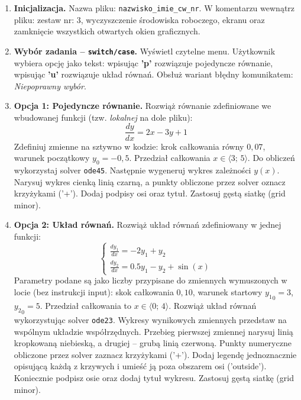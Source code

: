\documentclass[a4paper,11pt]{article}
\begin{document}
\begin{enumerate}[leftmargin=*, label=\textbf{\arabic*.}, itemsep=2pt]

  \item \textbf{Inicjalizacja.}
    Nazwa pliku: \texttt{nazwisko\_imie\_cw\_nr}. W komentarzu wewnątrz pliku: zestaw nr: 3, wyczyszczenie środowiska roboczego, ekranu oraz zamknięcie wszystkich otwartych okien graficznych.

  \item \textbf{Wybór zadania -- \texttt{switch/case}.}
    Wyświetl czytelne menu. Użytkownik wybiera opcję jako tekst: wpisując \textbf{'p'} rozwiązuje pojedyncze równanie, wpisując \textbf{'u'} rozwiązuje układ równań. Obsłuż wariant błędny komunikatem: \textit{Niepoprawny wybór}.

  \item \textbf{Opcja 1: Pojedyncze równanie.}
    Rozwiąż równanie zdefiniowane we wbudowanej funkcji (tzw. \textit{lokalnej} na dole pliku):
    \[ \frac{dy}{dx} = 2x - 3y + 1 \]
    Zdefiniuj zmienne na sztywno w kodzie: krok całkowania równy $0{,}07$, warunek początkowy $y_0 = -0{,}5$. Przedział całkowania $x \in \langle 3;\,5 \rangle$.
    Do obliczeń wykorzystaj solver \texttt{ode45}. Następnie wygeneruj wykres zależności $y(x)$. Narysuj wykres cienką linią czarną, a punkty obliczone przez solver oznacz krzyżykami ('+'). Dodaj podpisy osi oraz tytuł. Zastosuj gęstą siatkę (grid minor).

  \item \textbf{Opcja 2: Układ równań.}
    Rozwiąż układ równań zdefiniowany w jednej funkcji:\\[-0.5em]
    \[
    \begin{cases}
      \frac{dy_1}{dx} = -2y_1 + y_2 \\
      \frac{dy_2}{dx} = 0.5y_1 - y_2 + \sin(x)
    \end{cases}
    \]
    Parametry podane są jako liczby przypisane do zmiennych wymuszonych w locie (bez instrukcji input): skok całkowania $0{,}10$, warunek startowy $ {y_1}_{0} = 3 $, $ {y_2}_{0} = 5 $. Przedział całkowania to $x \in \langle 0;\,4 \rangle$.
    Rozwiąż układ równań wykorzystując solver \texttt{ode23}. Wykresy wynikowych zmiennych przedstaw na wspólnym układzie współrzędnych. Przebieg pierwszej zmiennej narysuj linią kropkowaną niebieską, a drugiej -- grubą linią czerwoną. Punkty numeryczne obliczone przez solver zaznacz krzyżykami ('+'). Dodaj legendę jednoznacznie opisującą każdą z krzywych i umieść ją poza obszarem osi ('outside'). Koniecznie podpisz osie oraz dodaj tytuł wykresu. Zastosuj gęstą siatkę (grid minor).

\end{enumerate}
\end{document}
